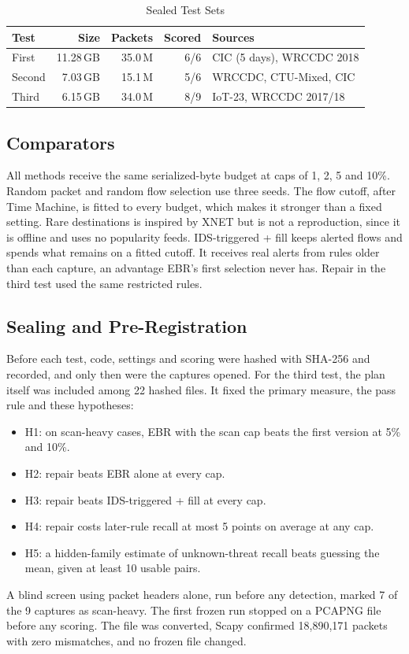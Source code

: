 \documentclass[conference]{IEEEtran}
\begin{document}
\begin{table}[t]
\centering
\caption{Sealed Test Sets}
\label{tab:data}
\footnotesize
\begin{tabular}{@{}lrrrl@{}}
\toprule
Test & Size & Packets & Scored & Sources\\
\midrule
First & 11.28\,GB & 35.0\,M & 6/6 & CIC (5 days), WRCCDC 2018\\
Second & 7.03\,GB & 15.1\,M & 5/6 & WRCCDC, CTU-Mixed, CIC\\
Third & 6.15\,GB & 34.0\,M & 8/9 & IoT-23, WRCCDC 2017/18\\
\bottomrule
\end{tabular}
\end{table}

\subsection{Comparators}
All methods receive the same serialized-byte budget at caps of 1, 2, 5 and 10\%. Random packet and random flow selection use three seeds. The flow cutoff, after Time Machine, is fitted to every budget, which makes it stronger than a fixed setting. Rare destinations is inspired by XNET but is not a reproduction, since it is offline and uses no popularity feeds. IDS-triggered + fill keeps alerted flows and spends what remains on a fitted cutoff. It receives real alerts from rules older than each capture, an advantage EBR's first selection never has. Repair in the third test used the same restricted rules.

\subsection{Sealing and Pre-Registration}
Before each test, code, settings and scoring were hashed with SHA-256 and recorded, and only then were the captures opened. For the third test, the plan itself was included among 22 hashed files. It fixed the primary measure, the pass rule and these hypotheses:
\begin{itemize}
\item H1: on scan-heavy cases, EBR with the scan cap beats the first version at 5\% and 10\%.
\item H2: repair beats EBR alone at every cap.
\item H3: repair beats IDS-triggered + fill at every cap.
\item H4: repair costs later-rule recall at most 5 points on average at any cap.
\item H5: a hidden-family estimate of unknown-threat recall beats guessing the mean, given at least 10 usable pairs.
\end{itemize}
A blind screen using packet headers alone, run before any detection, marked 7 of the 9 captures as scan-heavy. The first frozen run stopped on a PCAPNG file before any scoring. The file was converted, Scapy confirmed 18,890,171 packets with zero mismatches, and no frozen file changed.
\end{document}
